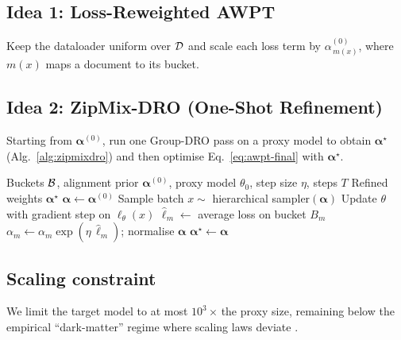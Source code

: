 \subsection{Idea 1: Loss-Reweighted AWPT}
Keep the dataloader uniform over $\mathcal{D}$ and scale each loss term by $\alpha^{(0)}_{\,m(x)}$, where $m(x)$ maps a document to its bucket.

\subsection{Idea 2: ZipMix-DRO (One-Shot Refinement)}
Starting from $\boldsymbol{\alpha}^{(0)}$, run one Group-DRO pass on a proxy model to obtain $\boldsymbol{\alpha}^{\star}$ (Alg.~\ref{alg:zipmixdro}) and then optimise Eq.~\eqref{eq:awpt-final} with $\boldsymbol{\alpha}^{\star}$.

\begin{algorithm}
\caption{ZipMix-DRO: One-Shot Group-DRO Refinement}\label{alg:zipmixdro}
\begin{algorithmic}[1]
\Require Buckets $\mathcal{B}$, alignment prior $\boldsymbol{\alpha}^{(0)}$,
         proxy model $\theta_0$, step size $\eta$, steps $T$
\Ensure Refined weights $\boldsymbol{\alpha}^{\star}$
\State $\boldsymbol{\alpha} \leftarrow \boldsymbol{\alpha}^{(0)}$
  \State Sample batch $x \sim$ hierarchical sampler$(\boldsymbol{\alpha})$
  \State Update $\theta$ with gradient step on $\ell_\theta(x)$
  \State $\hat{\ell}_m \leftarrow$ average loss on bucket $B_m$ 
  \State $\alpha_m \leftarrow \alpha_m \exp(\eta\,\hat{\ell}_m)$;
         normalise $\boldsymbol{\alpha}$
\EndFor
\State \Return $\boldsymbol{\alpha}^{\star} \leftarrow \boldsymbol{\alpha}$
\end{algorithmic}
\end{algorithm}

\subsection{Scaling constraint}\label{sec:scaling}
We limit the target model to at most $10^{3}$\,$\times$ the proxy size, remaining below the empirical ``dark-matter'' regime where scaling laws deviate \citep{gpt4report,schaeffer2024predictive}.


